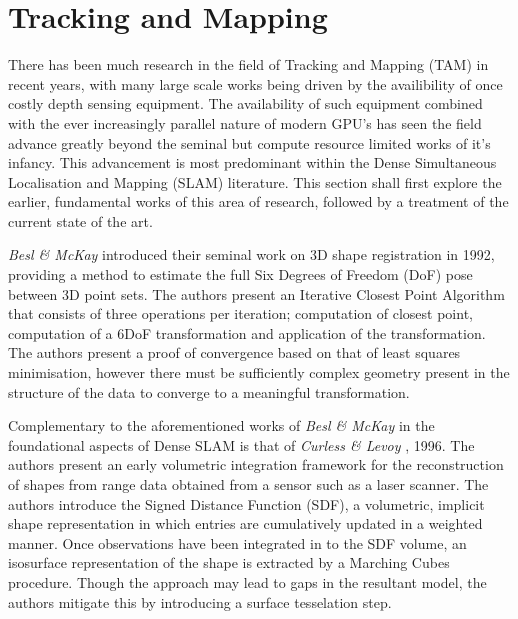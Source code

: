
\section{Tracking and Mapping}
\label{sec:lit_review_tam}
There has been much research in the field of Tracking and Mapping (TAM) in recent 
years, with many large scale works being driven by the availibility of once 
costly depth sensing equipment. The availability of such equipment combined 
with the ever increasingly parallel nature of modern GPU's has seen the 
field advance greatly beyond the seminal but compute resource limited works of it's 
infancy. This advancement is most predominant within the Dense Simultaneous 
Localisation and Mapping (SLAM) literature. This section shall first explore the 
earlier, fundamental works of this area of research, followed by a treatment 
of the current state of the art.

\textit{Besl \& McKay} \cite{Besl1992} introduced their seminal work on 3D shape 
registration in 1992, providing a method to estimate the full Six Degrees of 
Freedom (DoF) pose between 3D point sets. The authors present an Iterative Closest 
Point Algorithm that consists of three operations per iteration; computation 
of closest point, computation of a 6DoF transformation and application of 
the transformation. The authors present a proof of convergence based on that 
of least squares minimisation, however there must be sufficiently complex 
geometry present in the structure of the data to converge to a meaningful 
transformation.

Complementary to the aforementioned works of \textit{Besl \& McKay} \cite{Besl1992} 
in the foundational aspects of Dense SLAM is that of \textit{Curless \& Levoy} 
\cite{Curless1996}, 1996. The authors present an early volumetric integration 
framework for the reconstruction of shapes from range data obtained from a 
sensor such as a laser scanner. The authors introduce the Signed Distance Function (SDF), 
a volumetric, implicit shape representation in which entries are cumulatively updated 
in a weighted manner. Once observations have been integrated in to the SDF volume, an 
isosurface representation of the shape is extracted by a Marching Cubes \cite{Lorensen1987} 
procedure. Though the approach may lead to gaps in the resultant model, the authors 
mitigate this by introducing a surface tesselation step.

